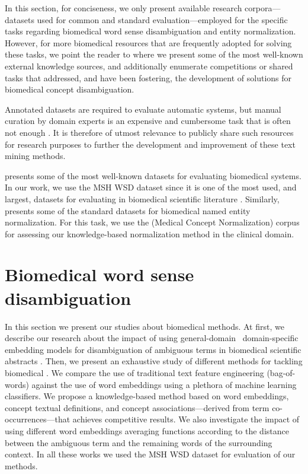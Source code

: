 In this section, for conciseness, we only present available research corpora---datasets used for common and standard evaluation---employed for the specific tasks regarding biomedical word sense disambiguation and entity normalization.
However, for more biomedical  resources that are frequently adopted for solving these tasks, we point the reader to  where we present some of the most well-known external knowledge sources, and additionally enumerate  competitions or shared tasks that addressed, and have been fostering, the development of solutions for biomedical concept disambiguation.

Annotated datasets are required to evaluate automatic systems, but manual curation by domain experts is an expensive and cumbersome task that is often not enough \parencite{baumgartner2007a,howe2008a,karp2016a}.
It is therefore of utmost relevance to publicly share such resources for research purposes to further the development and improvement of these text mining methods.

 presents some of the most well-known datasets for evaluating biomedical  systems.
In our work, we use the MSH WSD dataset since it is one of the most used, and largest, datasets for evaluating  in biomedical scientific literature \parencite{jimenoyepes2011a}.
Similarly,  presents some of the standard datasets for biomedical named entity normalization.
For this task, we use the  (Medical Concept Normalization) corpus \parencite{luo2019a} for assessing our knowledge-based normalization method in the clinical domain.


\section{Biomedical word sense disambiguation}

In this section we present our studies about biomedical  methods.
At first, we describe our research about the impact of using general-domain \versus\ domain-specific embedding models for disambiguation of ambiguous terms in biomedical scientific abstracts \parencite{antunes2016a}.
Then, we present an exhaustive study of different methods for tackling biomedical  \parencite{antunes2017a,antunes2017b,antunes2017c}.
We compare the use of traditional text feature engineering (bag-of-words) against the use of word embeddings using a plethora of machine learning classifiers.
We propose a knowledge-based method based on word embeddings, concept textual definitions, and concept associations---derived from  term co-occurrences---that achieves competitive results.
We also investigate the impact of using different word embeddings averaging functions according to the distance between the ambiguous term and the remaining words of the surrounding context.
In all these works we used the MSH WSD dataset for evaluation of our methods.


